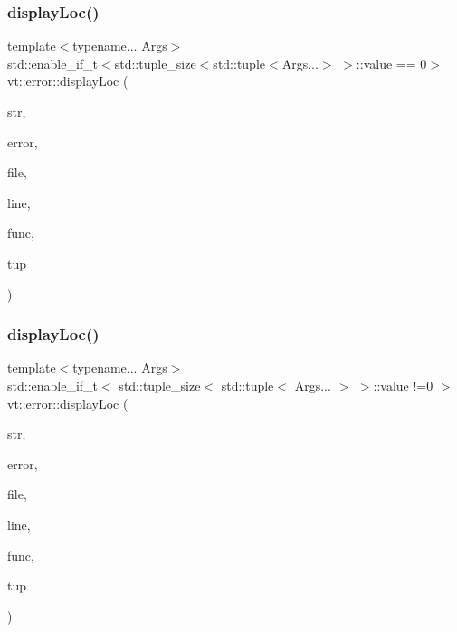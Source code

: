 \subsubsection{\texorpdfstring{display\+Loc()}{displayLoc()}\hspace{0.1cm}{\footnotesize\ttfamily [1/3]}}
{\footnotesize\ttfamily template$<$typename... Args$>$ \\
std\+::enable\+\_\+if\+\_\+t$<$std\+::tuple\+\_\+size$<$std\+::tuple$<$Args...$>$ $>$\+::value == 0$>$ vt\+::error\+::display\+Loc (\begin{DoxyParamCaption}\item[{std\+::string const \&}]{str,  }\item[{\hyperlink{namespacevt_a793764d753923abc3d32929870beb485}{Error\+Code\+Type}}]{error,  }\item[{std\+::string const \&}]{file,  }\item[{int const}]{line,  }\item[{std\+::string const \&}]{func,  }\item[{std\+::tuple$<$ Args... $>$ \&\&}]{tup }\end{DoxyParamCaption})\hspace{0.3cm}{\ttfamily [inline]}}

\mbox{\label{namespacevt_1_1error_acc630b11da3783f4c6b4eab8f9d9c081}} 
\subsubsection{\texorpdfstring{display\+Loc()}{displayLoc()}\hspace{0.1cm}{\footnotesize\ttfamily [2/3]}}
{\footnotesize\ttfamily template$<$typename... Args$>$ \\
std\+::enable\+\_\+if\+\_\+t$<$ std\+::tuple\+\_\+size$<$ std\+::tuple$<$ Args... $>$ $>$\+::value !=0 $>$ vt\+::error\+::display\+Loc (\begin{DoxyParamCaption}\item[{std\+::string const \&}]{str,  }\item[{\hyperlink{namespacevt_a793764d753923abc3d32929870beb485}{Error\+Code\+Type}}]{error,  }\item[{std\+::string const \&}]{file,  }\item[{int const}]{line,  }\item[{std\+::string const \&}]{func,  }\item[{std\+::tuple$<$ Args... $>$ \&\&}]{tup }\end{DoxyParamCaption})\hspace{0.3cm}{\ttfamily [inline]}}

